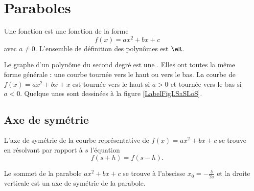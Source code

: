 


\section{Paraboles}

\begin{definition}
    Une fonction  est une fonction de la forme
    \begin{equation}
        f(x)=ax^2+bx+c
    \end{equation}
    avec \( a\neq 0\). L'ensemble de définition des polynômes est \( \eR\).
\end{definition}

\newcommand{\CaptionFigLSaSLoS}{Quelque paraboles.}


Le graphe d'un polynôme du second degré est une . Elles ont toutes la même forme générale : une courbe tournée vers le haut ou vers le bas. La courbe de \( f(x)=ax^2+bx+x\) est tournée vers le haut si \( a>0\) et tournée vers le bas si \( a<0\).
Quelque unes sont dessinées à la figure \ref{LabelFigLSaSLoS}. %

\subsection{Axe de symétrie}

L'axe de symétrie de la courbe représentative de \( f(x)=ax^2+bx+c\) se trouve en résolvant par rapport à \( s\) l'équation
\begin{equation}
    f(s+h)=f(s-h).
\end{equation}

\begin{Aretenir}
    Le sommet de la parabole \( ax^2+bx+c\) se trouve à l'abscisse \( x_0=-\frac{ b }{ 2a }\) et la droite verticale est un axe de symétrie de la parabole.
\end{Aretenir}

